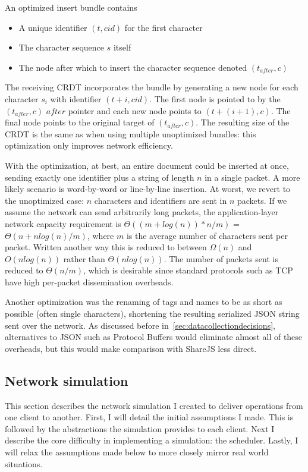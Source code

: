 \documentclass[12pt,a4paper,twoside,openright]{report}
\begin{document}
			An optimized insert bundle contains
			\begin{itemize}
				\item A unique identifier  $(t, cid)$ for the first character
				\item The character sequence $s$ itself
				\item The node after which to insert the character sequence denoted $(t_{after}, c)$
			\end{itemize}
			
			The receiving CRDT incorporates the bundle by generating a new node for each character $s_i$ with identifier $(t + i, cid)$. The first node is pointed to by the $(t_{after}, c)$ $after$ pointer and each new node points to $(t + (i+1), c)$. The final node points to the original target of $(t_{after}, c)$. The resulting size of the CRDT is the same as when using multiple unoptimized bundles: this optimization only improves network efficiency.
			
			With the optimization, at best, an entire document could be inserted at once, sending exactly one identifier plus a string of length $n$ in a single packet. A more likely scenario is word-by-word or line-by-line insertion. At worst, we revert to the unoptimized case: $n$ characters and identifiers are sent in $n$ packets. If we assume the network  can send arbitrarily long packets, the application-layer network capacity requirement is $\Theta ((m+log(n)) * n/m)$ = $\Theta (n + nlog(n)/m)$, where $m$ is the average number of characters sent per packet. Written another way this is reduced to between $\Omega (n)$ and $O(nlog(n))$ rather than $\Theta(nlog(n))$. The number of packets sent is reduced to $\Theta(n/m)$, which is desirable since standard protocols such as TCP have high per-packet dissemination overheads.
			
			Another optimization was the renaming of tags and names to be as short as possible (often single characters), shortening the resulting serialized JSON string sent over the network. As discussed before in~\cref{sec:datacollectiondecisions}, alternatives to JSON such as Protocol Buffers would eliminate almost all of these overheads, but this would make comparison with ShareJS less direct.
	
	\subsection{Network simulation}
	
		This section describes the network simulation I created to deliver operations from one client to another. First, I will detail the initial assumptions I made. This is followed by the abstractions the simulation provides to each client. Next I describe the core difficulty in implementing a simulation: the scheduler. Lastly, I will relax the assumptions made below to more closely mirror real world situations.
		
\end{document}
